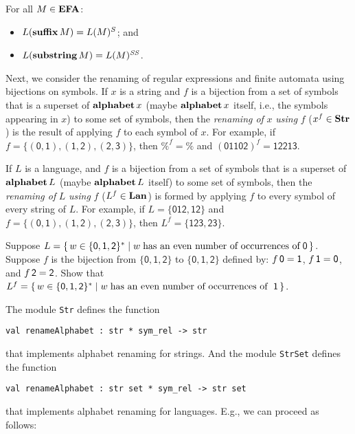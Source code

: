 \begin{theorem}
For all $M\in\mathbf{EFA}$:
\begin{itemize}
\item $L(\mathbf{suffix}\,M) = L(M)^S$; and

\item $L(\mathbf{substring}\,M) = L(M)^{\mathit{SS}}$.
\end{itemize}
\end{theorem}

Next, we consider the renaming of regular expressions and finite
automata using bijections on symbols.  If $x$ is a string and $f$ is a
bijection from a set of symbols that is a superset of $\mathbf{alphabet}\,x$
(maybe $\mathbf{alphabet}\,x$ itself, i.e., the symbols appearing in $x$) to
some set of symbols, then the \emph{renaming of} $x$ \emph{using} $f$
($x^f\in\mathbf{Str}$) is the result of applying $f$ to %
%
%
%
each symbol of $x$.  For example, if
$f=\mathsf{\{(0, 1), (1, 2), (2, 3)\}}$, then $\%^f=\%$ and
$(\mathsf{01102})^f=\mathsf{12213}$.

If $L$ is a language, and $f$ is a bijection from a set of symbols
that is a superset of $\mathbf{alphabet}\,L$ (maybe $\mathbf{alphabet}\,L$ itself)
to some set of symbols, then the \emph{renaming of} $L$ \emph{using}
%
%
%
%
$f$ ($L^f\in\mathbf{Lan}$) is formed by applying $f$ to every symbol of every string
of $L$.  For example, if $L=\{\mathsf{012, 12}\}$ and
$f=\mathsf{\{(0, 1), (1, 2), (2, 3)\}}$, then $L^f=\{\mathsf{123,
23}\}$.

\begin{exercise}
Suppose
$L = \{ \, w\in\{\mathsf{0,1,2}\}^* \mid w\;\allowbreak\mbox{has an even number
    of occurrences of}\allowbreak\;\mathsf{0} \, \}$. Suppose $f$ is the bijection from
$\{\mathsf{0,1,2}\}$ to $\{\mathsf{0,1,2}\}$ defined by:
$f\,\mathsf{0} = \mathsf{1}$, $f\,\mathsf{1} = \mathsf{0}$, and
$f\,\mathsf{2} = \mathsf{2}$. Show that $L^f = 
\{ \, w\in\{\mathsf{0,1,2}\}^* \mid w\;\allowbreak\mbox{has an even number
    of occurrences of }\allowbreak\;\mathsf{1} \, \}$.
\end{exercise}

The module \texttt{Str}
%
defines the function
\begin{verbatim}
val renameAlphabet : str * sym_rel -> str
\end{verbatim}
that implements alphabet renaming for strings.
And the module \texttt{StrSet}
%
defines the function
\begin{verbatim}
val renameAlphabet : str set * sym_rel -> str set
\end{verbatim}
%
that implements alphabet renaming for languages.
E.g., we can proceed as follows:



